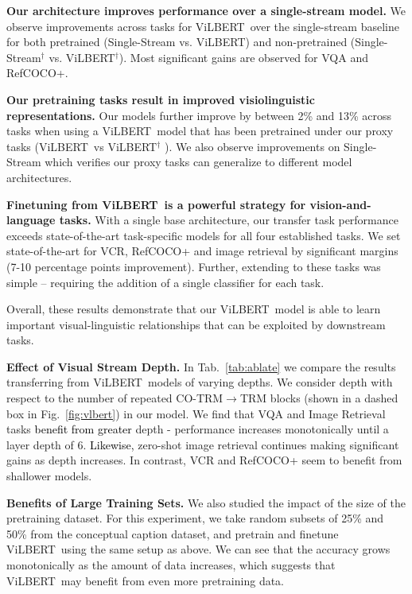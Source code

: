 \begin{compactitem}[--]

\item \textbf{Our architecture improves performance over a single-stream model.} We observe improvements across tasks for ViLBERT~over the single-stream baseline for both pretrained (Single-Stream vs. ViLBERT) and non-pretrained (Single-Stream$^\dagger$ vs. ViLBERT$^\dagger$). Most significant gains are observed for VQA and RefCOCO+.

\item \textbf{Our pretraining tasks result in improved visiolinguistic representations.} Our models further improve by between 2\% and 13\% across tasks when using a  ViLBERT~model that has been pretrained under our proxy tasks (ViLBERT~vs ViLBERT$^\dagger$ ). We also observe improvements on Single-Stream which verifies our proxy tasks can generalize to different model architectures. 

\item \textbf{Finetuning from ViLBERT~is a powerful strategy for vision-and-language tasks.} With a single base architecture, our transfer task performance exceeds  state-of-the-art task-specific models for all four established tasks. We set state-of-the-art for VCR, RefCOCO+ and image retrieval by significant margins (7-10 percentage points improvement). Further, extending to these tasks was simple -- requiring the addition of a single classifier for each task.

\end{compactitem}

Overall, these results demonstrate that our ViLBERT~model is able to learn important visual-linguistic relationships that can be exploited by downstream tasks. 

\textbf{Effect of Visual Stream Depth.} In Tab.~\ref{tab:ablate} we compare the results transferring from ViLBERT~models of varying depths. We consider depth with respect to the number of repeated CO-TRM$\rightarrow$TRM blocks (shown in a dashed box in Fig.~\ref{fig:vlbert}) in our model. We find that VQA and Image Retrieval tasks \textcolor{Black}{benefit from greater} depth - performance increases monotonically until a layer depth of 6. \textcolor{Black}{Likewise,} zero-shot image retrieval continues making significant gains as depth increases. In contrast, VCR and RefCOCO+ seem to benefit from shallower models.

\textbf{Benefits of Large Training Sets.} We also studied the impact of the size of the pretraining dataset. For this experiment, we take random subsets of 25\% and 50\% from the conceptual caption dataset, and pretrain and finetune ViLBERT~using the same setup as above. We can see that the accuracy grows monotonically as the amount of data increases, which suggests that  ViLBERT~may benefit from even more pretraining data. 


